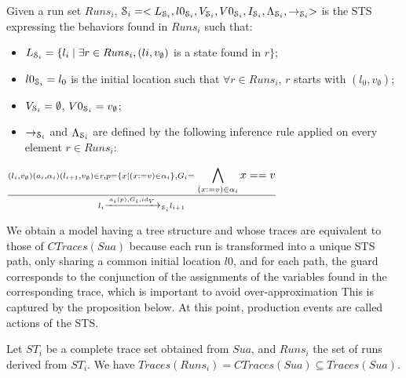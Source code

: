 \begin{definition}
  Given a run set $Runs_i$, $\EuScript{S}_i=<L_{\EuScript{S}_i},
  l0_{\EuScript{S}_i},V_{\EuScript{S}_i}, V0_{\EuScript{S}_i},
  I_{\EuScript{S}_i},\\
  \Lambda_{\EuScript{S}_i},\rightarrow_{\EuScript{S}_i}>$ is the
  STS expressing the behaviors found in $Runs_i$ such that:

	\begin{itemize}
    \item $L_{\EuScript{S}_i}= \{l_i \mid \exists r\in Runs_i,
      (li,v_\emptyset)$ is a state found in $r\}$;

    \item $l0_{\EuScript{S}_i} = l_0$ is the initial location
      such that $\forall r \in Runs_i$, $r$ starts with
      $(l_0,v_\emptyset)$;

    \item $V_{\EuScript{S}_i}=\emptyset$, $V0_{\EuScript{S}_i}=v_\emptyset$;

    \item $\rightarrow_{\EuScript{S}_i}$ and
      $\Lambda_{\EuScript{S}_i}$ are defined by the following
      inference rule applied on every element $r\in Runs_i$:
	\end{itemize}

  \begin{center}
    {\Large
    $\frac{(l_i,v_\emptyset) (a_i,\alpha_i) (l_{i+1},v_\emptyset)
    \in r, p=\{x \mid (x:=v)\in \alpha_i \}, G_i=\displaystyle
  \bigwedge_{(x:=v)\in \alpha_i}x==v}{l_i \xrightarrow{a_i(p),G_i,id_V}_{\EuScript{S}_i} l_{i+1}}$
    }
  \end{center}


  \label{def:runset_to_sts}
\end{definition}

We obtain a model having a tree structure and whose traces are
equivalent \cite{petrenko06} to those of $CTraces(Sua)$ because
each run is transformed into a unique STS path, only sharing a
common initial location $l0$, and for each path, the guard
corresponds to the conjunction of the assignments of the
variables found in the corresponding trace, which is important to
avoid over-approximation This is captured by the proposition
below. At this point, production events are called actions of the
STS.

\begin{proposition}
    Let $ST_i$ be a complete trace set obtained from
    $\mathit{Sua}$, and $Runs_i$ the set of runs derived from
    $ST_i$.
    We have $Traces(Runs_i) = CTraces(Sua) \subseteq Traces(Sua)$.

    \label{}
\end{proposition}

